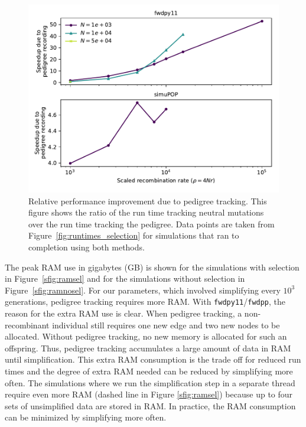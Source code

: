 \documentclass{article}
\newcommand{\fwdpp}{\texttt{fwdpp}}
\newcommand{\fwdpy}{\texttt{fwdpy11}}
\newcommand{\krt}[1]{{\em \color{green} #1}}
\begin{document}
\begin{figure}
    \includegraphics[]{sims/speedup}
    \caption{\label{fig:relative_speedup_selection}Relative performance improvement due to pedigree tracking. This figure
    shows the ratio of the run time tracking neutral mutations over the run time tracking the pedigree. Data points are taken
from Figure~\ref{fig:runtimes_selection} for simulations that ran to completion using both methods.}
\end{figure}

The peak RAM use in gigabytes (GB) is shown for the simulations with selection in Figure~\ref{sfig:ramsel} and for the
simulations without selection in Figure~\ref{sfig:ramnosel}.  For our parameters, which involved simplifying every
$10^3$ generations,  pedigree tracking requires more RAM.  With \fwdpy{}/\fwdpp{}, the reason for the extra RAM use is clear.  When pedigree tracking, a non-recombinant
individual still requires one new edge and two new nodes to be allocated.  Without pedigree tracking, no new memory is
allocated for such an offspring.  Thus, pedigree tracking accumulates a large amount of data in RAM until
simplification.  This extra RAM consumption is the trade off for reduced run times and the degree of extra RAM needed
can be reduced by simplifying more often.  The simulations where we run the simplification step in a separate thread
require even more RAM (dashed line in Figure \ref{sfig:ramsel}) because up to four sets of unsimplified data are
stored in RAM.  In practice, the RAM consumption can be minimized by simplifying more often.

\end{document}
